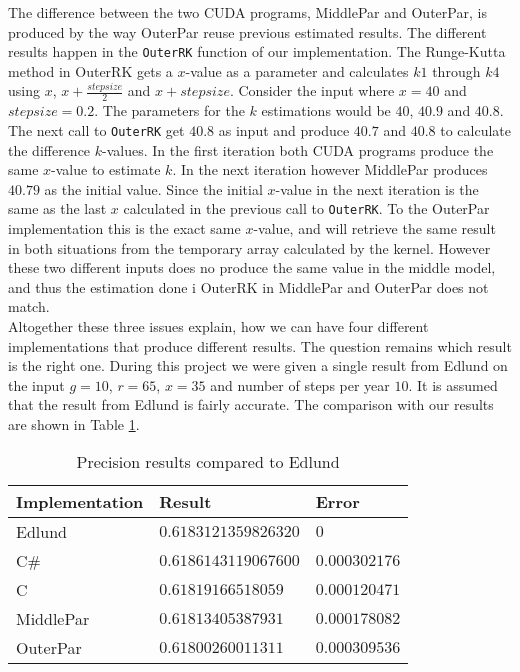The difference between the two CUDA programs, MiddlePar and OuterPar, is produced by the way OuterPar reuse previous estimated results. The different results happen in the \texttt{OuterRK} function of our implementation. The Runge-Kutta method in OuterRK gets a $x$-value as a parameter and calculates $k1$ through $k4$ using $x$, $x+\frac{stepsize}{2}$ and $x+stepsize$. Consider the input where $x = 40$ and $stepsize = 0.2$. The parameters for the $k$ estimations would be $40$, $40.9$ and $40.8$. The next call to \texttt{OuterRK} get $40.8$ as input and produce $40.7$ and $40.8$ to calculate the difference $k$-values. In the first iteration both CUDA programs produce the same $x$-value to estimate $k$. In the next iteration however MiddlePar produces $40.79$ as the initial value. Since the initial $x$-value in the next iteration is the same as the last $x$ calculated in the previous call to \texttt{OuterRK}. To the OuterPar implementation this is the exact same $x$-value, and will retrieve the same result in both situations from the temporary array calculated by the kernel. However these two different inputs does no produce the same value in the middle model, and thus the estimation done i OuterRK in MiddlePar and OuterPar does not match.\\

Altogether these three issues explain, how we can have four different implementations that produce different results. The question remains which result is the right one. During this project we were given a single result from Edlund on the input $g=10$, $r=65$, $x=35$ and number of steps per year $10$. It is assumed that the result from Edlund is fairly accurate. The comparison with our results are shown in Table \ref{table:precision}.

\begin{table}
\begin{center}
\begin{tabular}[t]{|l|l|l|}
	\hline
\textbf{Implementation}&\textbf{Result}&\textbf{Error}\\\hline
Edlund&$0.6183121359826320$&$0$\\\hline
C\#&$0.6186143119067600$&$0.000302176$\\\hline
C&$0.61819166518059$&$0.000120471$\\\hline
MiddlePar&$0.61813405387931$&$0.000178082$\\\hline
OuterPar&$0.61800260011311$&$0.000309536$\\\hline
\end{tabular}
\end{center}
\caption{Precision results compared to Edlund}
\label{table:precision}
\end{table}

